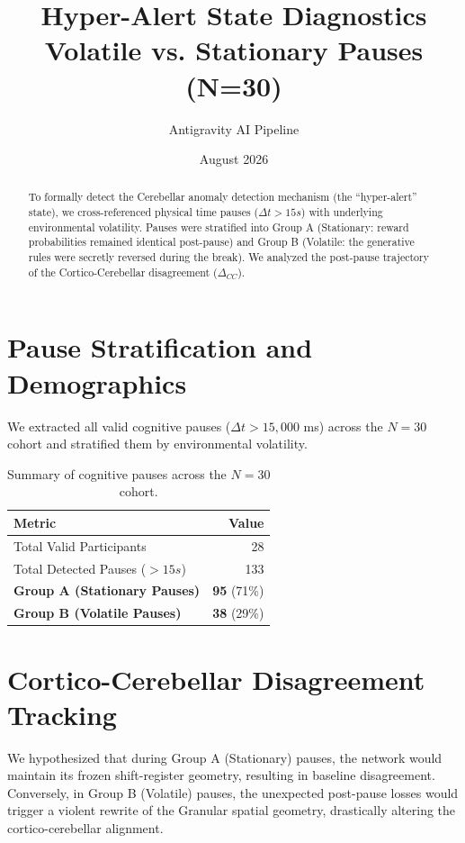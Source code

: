 \documentclass[11pt,a4paper]{article}
\title{\textbf{Hyper-Alert State Diagnostics}\\ \Large Volatile vs. Stationary Pauses (N=30)}
\author{Antigravity AI Pipeline}
\date{August 2026}
\begin{document}
\maketitle

\begin{abstract}
To formally detect the Cerebellar anomaly detection mechanism (the ``hyper-alert'' state), we cross-referenced physical time pauses ($\Delta t > 15s$) with underlying environmental volatility. Pauses were stratified into Group A (Stationary: reward probabilities remained identical post-pause) and Group B (Volatile: the generative rules were secretly reversed during the break). We analyzed the post-pause trajectory of the Cortico-Cerebellar disagreement ($\Delta_{CC}$).
\end{abstract}

\section{Pause Stratification and Demographics}
We extracted all valid cognitive pauses ($\Delta t > 15,000$ ms) across the $N=30$ cohort and stratified them by environmental volatility.

\begin{table}[h!]
    \centering
    \begin{tabular}{lr}
        \toprule
        \textbf{Metric} & \textbf{Value} \\
        \midrule
        Total Valid Participants & 28 \\
        Total Detected Pauses ($>15s$) & 133 \\
        \textbf{Group A (Stationary Pauses)} & \textbf{95} (71\%) \\
        \textbf{Group B (Volatile Pauses)} & \textbf{38} (29\%) \\
        \bottomrule
    \end{tabular}
    \caption{Summary of cognitive pauses across the $N=30$ cohort.}
\end{table}

\section{Cortico-Cerebellar Disagreement Tracking}
We hypothesized that during Group A (Stationary) pauses, the network would maintain its frozen shift-register geometry, resulting in baseline disagreement. Conversely, in Group B (Volatile) pauses, the unexpected post-pause losses would trigger a violent rewrite of the Granular spatial geometry, drastically altering the cortico-cerebellar alignment.
\end{document}
